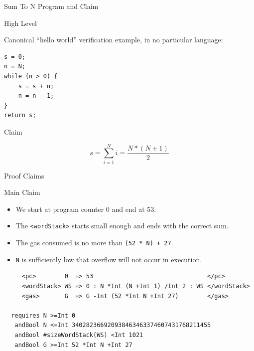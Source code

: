 \documentclass[8pt,ignorenonframetext,]{beamer}
\providecommand{\tightlist}{%
  \setlength{\itemsep}{0pt}\setlength{\parskip}{0pt}}
\begin{document}
\begin{frame}[fragile]{Sum To N Program and Claim}

\pause

\begin{block}{High Level}

Canonical ``hello world'' verification example, in no particular
language:

\begin{verbatim}
s = 0;
n = N;
while (n > 0) {
    s = s + n;
    n = n - 1;
}
return s;
\end{verbatim}

\pause

\end{block}

\begin{block}{Claim}

\[s = \sum_{i = 1}^N i = \frac{N * (N + 1)}{2}\]

\end{block}

\end{frame}

\begin{frame}[fragile]{Proof Claims}

\pause

\begin{block}{Main Claim}

\begin{itemize}
\tightlist
\item
  We start at program counter 0 and end at 53.
\item
  The \texttt{\textless{}wordStack\textgreater{}} starts small enough
  and ends with the correct sum.
\item
  The gas consumed is no more than \texttt{(52\ *\ N)\ +\ 27}.
\item
  \texttt{N} is sufficiently low that overflow will not occur in
  execution.
\end{itemize}

\pause

\begin{verbatim}
     <pc>        0  => 53                                </pc>
     <wordStack> WS => 0 : N *Int (N +Int 1) /Int 2 : WS </wordStack>
     <gas>       G  => G -Int (52 *Int N +Int 27)        </gas>

  requires N >=Int 0
   andBool N <=Int 340282366920938463463374607431768211455
   andBool #sizeWordStack(WS) <Int 1021
   andBool G >=Int 52 *Int N +Int 27
\end{verbatim}

\end{block}

\end{frame}
\end{document}
